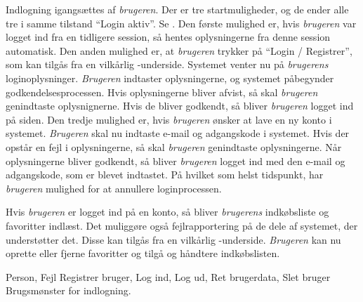 {Indlogning igangsættes af \textit{brugeren}. Der er tre startmuligheder, og de ender alle tre i samme tilstand “Login aktiv”. Se . Den første mulighed er, hvis \textit{brugeren} var logget ind fra en tidligere session, så hentes oplysningerne fra denne session automatisk. Den anden mulighed er, at \textit{brugeren} trykker på “Login / Registrer”, som kan tilgås fra en vilkårlig \Foodl-underside. Systemet venter nu på \textit{brugerens} loginoplysninger. \textit{Brugeren} indtaster oplysningerne, og systemet påbegynder godkendelsesprocessen. Hvis oplysningerne bliver afvist, så skal \textit{brugeren} genindtaste oplysnignerne. Hvis de bliver godkendt, så bliver \textit{brugeren} logget ind på siden. Den tredje mulighed er, hvis \textit{brugeren} ønsker at lave en ny konto i systemet. \textit{Brugeren} skal nu indtaste e-mail og adgangskode i systemet. Hvis der opstår en fejl i oplysningerne, så skal \textit{brugeren} genindtaste oplysningerne. Når oplysningerne bliver godkendt, så bliver \textit{brugeren} logget ind med den e-mail og adgangskode, som er blevet indtastet. På hvilket som helst tidspunkt, har \textit{brugeren} mulighed for at annullere loginprocessen.

Hvis \textit{brugeren} er logget ind på en konto, så bliver \textit{brugerens} indkøbsliste og favoritter indlæst. Det muliggøre også fejlrapportering på de dele af systemet, der understøtter det. Disse kan tilgås fra en vilkårlig \Foodl-underside. \textit{Brugeren} kan nu oprette eller fjerne favoritter og tilgå og håndtere indkøbslisten.}
{Person, Fejl}
{Registrer bruger, Log ind, Log ud, Ret brugerdata, Slet bruger}
{Brugsmønster for indlogning.}


